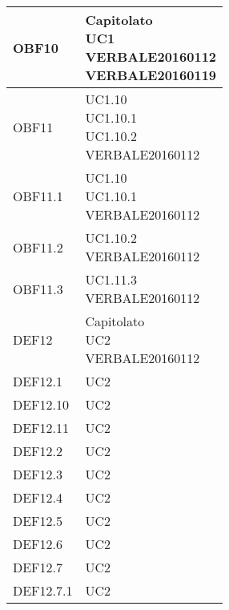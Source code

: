 \documentclass{scalatekids-article}
\begin{document}
\begin{longtable}[H]{|p{5.5cm}|p{5.5cm}|}
  \hline
  OBF10 & \multiLineCell[t]{Capitolato\\UC1\\VERBALE20160112\\VERBALE20160119\\}\\
  \hline
  OBF11 & \multiLineCell[t]{UC1.10\\UC1.10.1\\UC1.10.2\\VERBALE20160112\\}\\
  \hline
  OBF11.1 & \multiLineCell[t]{UC1.10\\UC1.10.1\\VERBALE20160112\\}\\
  \hline
  OBF11.2 & \multiLineCell[t]{UC1.10.2\\VERBALE20160112\\}\\
  \hline
  OBF11.3 & \multiLineCell[t]{UC1.11.3\\VERBALE20160112\\}\\
  \hline
  DEF12 & \multiLineCell[t]{Capitolato\\UC2\\VERBALE20160112\\}\\
  \hline
  DEF12.1 & \multiLineCell[t]{UC2\\}\\
  \hline
  DEF12.10 & \multiLineCell[t]{UC2\\}\\
  \hline
  DEF12.11 & \multiLineCell[t]{UC2\\}\\
  \hline
  DEF12.2 & \multiLineCell[t]{UC2\\}\\
  \hline
  DEF12.3 & \multiLineCell[t]{UC2\\}\\
  \hline
  DEF12.4 & \multiLineCell[t]{UC2\\}\\
  \hline
  DEF12.5 & \multiLineCell[t]{UC2\\}\\
  \hline
  DEF12.6 & \multiLineCell[t]{UC2\\}\\
  \hline
  DEF12.7 & \multiLineCell[t]{UC2\\}\\
  \hline
  DEF12.7.1 & \multiLineCell[t]{UC2\\}\\

\end{longtable}
\end{document}
